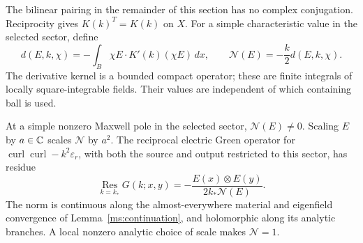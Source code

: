 The bilinear pairing in the remainder of this section has no
complex conjugation.  Reciprocity gives $K(k)^T=K(k)$ on $X$.
For a simple characteristic value in the selected sector, define
\begin{equation}
 d(E,k,\chi)=-\int_B \chi E\cdot K'(k)(\chi E)\,dx,
 \qquad \mathcal N(E)=-\frac{k}{2}d(E,k,\chi).
 \label{ms:residue-norm}
\end{equation}
The derivative kernel is a bounded compact operator; these are
finite integrals of locally square-integrable fields.  Their values
are independent of which containing ball is used.

\begin{lemma}
\label{ms:normalization}
At a simple nonzero Maxwell pole in the selected sector,
$\mathcal N(E)\ne0$.  Scaling $E$ by $a\in\mathbb C$ scales
$\mathcal N$ by $a^2$.  The reciprocal electric Green operator for
$\operatorname{curl}\operatorname{curl}-k^2\varepsilon_r$,
with both the source and output restricted to this sector, has residue
\begin{equation}
 \operatorname*{Res}_{k=k_*}G(k;x,y)
       =-\frac{E(x)\otimes E(y)}{2k_*\mathcal N(E)}.
 \label{ms:green-residue}
\end{equation}
The norm is continuous along the almost-everywhere material and
eigenfield convergence of Lemma~\ref{ms:continuation}, and
holomorphic along its analytic branches.  A local nonzero analytic
choice of scale makes $\mathcal N=1$.
\end{lemma}

